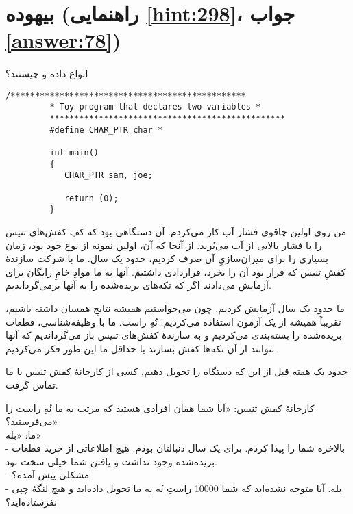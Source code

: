 \section[بیهوده]{بیهوده \protect{} (راهنمایی \ref{hint:298}، جواب \ref{answer:78})}
\paragraph{}\label{prog:73}
انواع داده  و  چیستند؟

\begin{LTR}
    \begin{lstlisting}[style=C++Style]
         /************************************************
         * Toy program that declares two variables *
         ************************************************
         #define CHAR_PTR char *

         int main()
         {
         	CHAR_PTR sam, joe;

         	return (0);
         }
    \end{lstlisting}
\end{LTR}

\begin{tcolorbox}
    من روی اولین چاقوی فشار آب کار می‌کردم. آن دستگاهی بود که کفِ کفش‌های تنیس را با فشار بالایی از آب می‌بُرید. از آنجا که آن، اولین نمونه از نوع خود بود، زمان بسیاری را برای میزان‌سازیِ آن صرف کردیم، حدود یک سال. ما با شرکت سازندهٔ کفشِ تنیس که قرار بود آن را بخرد، قراردادی داشتیم. آنها به ما موادِ خامِ رایگان برای آزمایش می‌دادند اگر که تکه‌های بریده‌شده را به آنها برمی‌گرداندیم.

    ما حدود یک سال آزمایش کردیم. چون می‌خواستیم همیشه نتایجِ همسان داشته باشیم، تقریباً همیشه از یک آزمون استفاده می‌کردیم: نُهِ راست. ما با وظیفه‌شناسی، قطعات بریده‌شده را بسته‌بندی می‌کردیم و به سازندهٔ کفش‌های تنیس باز می‌گرداندیم که آنها بتوانند از آن تکه‌ها کفش بسازند یا حداقل ما این طور فکر می‌کردیم.

    حدود یک هفته قبل از این که دستگاه را تحویل دهیم، کسی از کارخانهٔ کفش تنیس با ما تماس گرفت.

    کارخانهٔ کفش تنیس: «آیا شما همان افرادی هستید که مرتب به ما نُهِ راست را می‌فرستید؟»\\
    ما: «بله»\\
    - بالاخره شما را پیدا کردم. برای یک سال دنبالتان بودم. هیچ اطلاعاتی از خرید قطعات بریده‌شده وجود نداشت و یافتن شما    خیلی سخت بود.\\
    - مشکلی پیش آمده؟\\
    - بله. آیا متوجه نشده‌اید که شما 10000 راستِ نُه به ما تحویل داده‌اید و هیچ لنگهٔ چپی نفرستاده‌اید؟
\end{tcolorbox}
